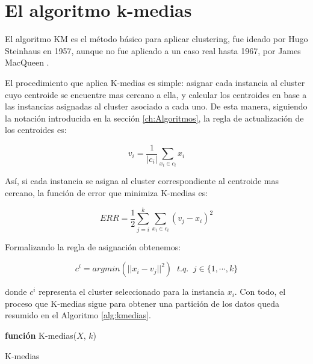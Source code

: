 \chapter{El algoritmo k-medias}\label{ap:kmeans}

El algoritmo \acf{KM} es el método básico para aplicar clustering, fue ideado por  Hugo Steinhaus en 1957, aunque no fue aplicado a un caso real hasta 1967, por James MacQueen \cite{KMEANS:1967}. 

El procedimiento que aplica K-medias es simple: asignar cada instancia al cluster cuyo centroide se encuentre mas cercano a ella, y calcular los centroides en base a las instancias asignadas al cluster asociado a cada uno. De esta manera, siguiendo la notación introducida en la sección \ref{ch:Algoritmos}, la regla de actualización de los centroides es:

\begin{equation}
v_i = \frac{1}{|c_i|} \sum_{x_i \in c_i} x_i
\label{a1}
\end{equation}

Así, si cada instancia se asigna al cluster correspondiente al centroide mas cercano, la función de error que minimiza K-medias es:

\begin{equation}
ERR = \frac{1}{2} \sum_{j = i}^{k} \sum_{x_i \in c_i} (v_j - x_i)^2
\label{a2}
\end{equation}

Formalizando la regla de asignación obtenemos:

\begin{equation}
c^i = argmin(||x_i - v_j||^2) \;\; t.q. \;\; j \in \{1, \cdots, k\}
\label{a3}
\end{equation}

donde $c^i$ representa el cluster seleccionado para la instancia $x_i$. Con todo, el proceso que K-medias sigue para obtener una partición de los datos queda resumido en el Algoritmo \ref{alg:kmedias}.

\begin{algorithm}
	
	\BlankLine
	\BlankLine
	\textbf{función} K-medias($X$, $k$) 
	\BlankLine
	\caption{K-medias}
	\label{alg:kmedias}
\end{algorithm}


